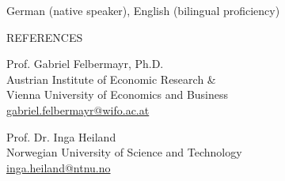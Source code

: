 \documentclass{article}
\newlength{\cvlabelwidth}\setlength{\cvlabelwidth}{0.12\textwidth}
\newlength{\cvlabelgap}\setlength{\cvlabelgap}{5mm}
\newcommand{\cvmakelabel}[1]{%
    \smash{\parbox[t]{\cvlabelwidth}{\raggedright{\fontfamily{phv}\selectfont #1}}}}
\newenvironment{cvsection}[1]{%
    \par\medskip
    \begin{list}{}{%
        \setlength{\leftmargin}{\dimexpr\cvlabelwidth+\cvlabelgap\relax}%
        \setlength{\labelwidth}{\cvlabelwidth}%
        \setlength{\labelsep}{\cvlabelgap}%
        \setlength{\rightmargin}{0pt}%
        \setlength{\itemindent}{0pt}%
        \setlength{\listparindent}{0pt}%
        \setlength{\topsep}{0pt}%
        \setlength{\partopsep}{0pt}%
        \setlength{\parsep}{0.3em}%
        \setlength{\itemsep}{0pt}%
        \let\makelabel\cvmakelabel%
    }%
    \item[#1]\ignorespaces%
}{%
    \end{list}\medskip%
}
\begin{document}

\begin{cvsection}{LANGUAGES}
    German (native speaker), English (bilingual proficiency)
\end{cvsection}


\begin{minipage}[t]{0.12\textwidth}
    {\selectfont REFERENCES} \\
\end{minipage}
\hspace{5mm}
\begin{minipage}[t]{0.4\textwidth}
    Prof. Gabriel Felbermayr, Ph.D. \\
    Austrian Institute of Economic Research \& \\
    Vienna University of Economics and Business \\
\href{mailto:gabriel.felbermayr@wifo.ac.at}{gabriel.felbermayr@wifo.ac.at}
\end{minipage}
\hspace{5mm}
\begin{minipage}[t]{0.4\textwidth}
    Prof. Dr. Inga Heiland \\
    Norwegian University of Science and Technology \\
\href{mailto:inga.heiland@ntnu.no}{inga.heiland@ntnu.no}
\end{minipage}
\bigskip
\bigskip

\end{document}
